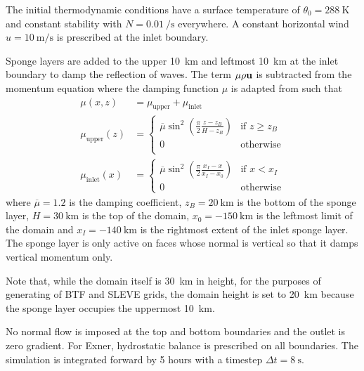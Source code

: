 \documentclass[twocol]{ametsoc}
\begin{document}
The initial thermodynamic conditions have a surface temperature of $\theta_0 = \SI{288}{\kelvin}$ and constant stability with $N = \SI{0.01}{\per\second}$ everywhere.  A constant horizontal wind $u = \SI{10}{\meter\per\second}$ is prescribed at the inlet boundary.

Sponge layers are added to the upper \SI{10}{\kilo\meter} and leftmost \SI{10}{\kilo\meter} at the inlet boundary to damp the reflection of waves.
The term $\mu \rho \bf{u}$ is subtracted from the momentum equation  where the damping function $\mu$ is adapted from \citet{melvin2010} such that
\begin{align}
	\mu(x, z) &= \mu_\mathrm{upper} + \mu_\mathrm{inlet} \\
	\mu_\mathrm{upper}(z) &= \begin{cases}
		\overline{\mu} \sin^2 \left( \frac{\pi}{2} \frac{z - z_B}{H - z_B} \right) & \text{if } z \geq z_B \\
		0 & \text{otherwise} \\
	\end{cases} \\
	\mu_\mathrm{inlet}(x) &= \begin{cases}
		\overline{\mu} \sin^2 \left( \frac{\pi}{2} \frac{x_I - x}{x_I - x_0} \right) & \text{if } x < x_I \\
		0 & \text{otherwise}
	\end{cases}
\end{align}
where $\overline{\mu} = 1.2$ is the damping coefficient, $z_B = \SI{20}{\kilo\meter}$ is the bottom of the sponge layer, $H = \SI{30}{\kilo\meter}$ is the top of the domain, $x_0 = \SI{-150}{\kilo\meter}$ is the leftmost limit of the domain and $x_I = \SI{-140}{\kilo\meter}$ is the rightmost extent of the inlet sponge layer.  The sponge layer is only active on faces whose normal is vertical so that it damps vertical momentum only.

Note that, while the domain itself is \SI{30}{\kilo\meter} in height, for the purposes of generating of BTF and SLEVE grids, the domain height is set to \SI{20}{\kilo\meter} because the sponge layer occupies the uppermost \SI{10}{\kilo\meter}.

No normal flow is imposed at the top and bottom boundaries and the outlet is zero gradient.  For Exner, hydrostatic balance is prescribed on all boundaries.  The simulation is integrated forward by 5 hours with a timestep $\Delta t = \SI{8}{\second}$.
\end{document}
